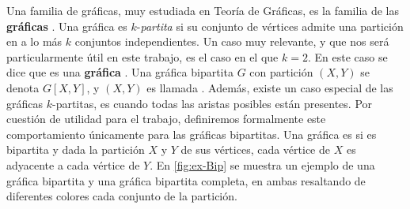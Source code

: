 Una familia de gr\'aficas, muy estudiada en Teor\'ia de Gr\'aficas, es la
familia de las \textbf{gr\'aficas }. Una
gr\'afica es $k$-\textit{partita} si su conjunto de v\'ertices admite una
partici\'on en a lo m\'as $k$ conjuntos independientes. Un caso muy relevante, y
que nos ser\'a particularmente \'util en este trabajo, es el caso en el que
$k=2$. En este caso se dice que es una \textbf{gr\'afica}
. Una gr\'afica
bipartita $G$ con partici\'on $(X,Y)$ se denota $G[X,Y]$, y $(X,Y)$ es llamada
. Adem\'as, existe un caso especial de las gr\'aficas
$k$-partitas, es cuando todas las aristas posibles est\'an presentes. Por
cuesti\'on de utilidad para el trabajo, definiremos formalmente este
comportamiento \'unicamente para las gr\'aficas bipartitas. Una gr\'afica es
 si es
bipartita y dada la partici\'on $X$ y $Y$ de sus v\'ertices, cada v\'ertice de
$X$ es adyacente a cada v\'ertice de $Y$. En \cref{fig:ex-Bip} se muestra un
ejemplo de una gr\'afica bipartita y una gr\'afica bipartita completa, en ambas
resaltando de diferentes colores cada conjunto de la partici\'on. 

